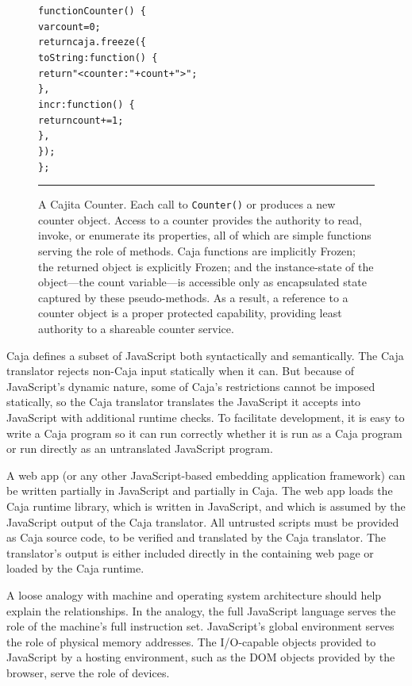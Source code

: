 \documentclass[letterpaper,twocolumn,10pt]{article}
\newcommand{\code}[1]{{\tt {#1}}}              %
\begin{document}
\begin{figure}[t!]
\begin{alltt}
function Counter()\ \{
  var count = 0;
  return caja.freeze(\{
    toString: function()\ \{ 
      return "<counter: " + count + ">"; 
    \},
    incr: function()\ \{ 
      return count += 1; 
    \},
  \});
\};
\end{alltt}

\caption[A Cajita Counter.]{A Cajita Counter. Each call to \code{Counter()} 
or produces a new counter object. Access to a counter provides the authority 
to read, invoke, or enumerate its properties, all of which are simple 
functions serving the role of methods. Caja functions are implicitly Frozen; 
the returned object is explicitly Frozen; and the instance-state of the 
object---the count variable---is accessible only as encapsulated state 
captured by these pseudo-methods. As a result, a reference to a counter 
object is a proper protected capability, providing least authority to a 
shareable counter service. \\ } \hrule
\label{fig:cajita-counter}
\end{figure}

Caja defines a subset of JavaScript both syntactically and semantically. The 
Caja translator rejects non-Caja input statically when it can. But because 
of JavaScript's dynamic nature, some of Caja's restrictions cannot be 
imposed statically, so the Caja translator translates the JavaScript it 
accepts into JavaScript with additional runtime checks. To facilitate 
development, it is easy to write a Caja program so it can run correctly 
whether it is run as a Caja program or run directly as an untranslated 
JavaScript program.

A web app (or any other JavaScript-based embedding application framework) can 
be written partially in JavaScript and partially in Caja. The web app loads 
the Caja runtime library, which is written in JavaScript, and which is 
assumed by the JavaScript output of the Caja translator. All untrusted 
scripts must be provided as Caja source code, to be verified and translated 
by the Caja translator. The translator's output is either included directly 
in the containing web page or loaded by the Caja runtime.

A loose analogy with machine and operating system architecture should help 
explain the relationships. In the analogy, the full JavaScript language 
serves the role of the machine's full instruction set. JavaScript's global 
environment serves the role of physical memory addresses. The I/O-capable 
objects provided to JavaScript by a hosting environment, such as the DOM 
objects provided by the browser, serve the role of devices.
\end{document}
